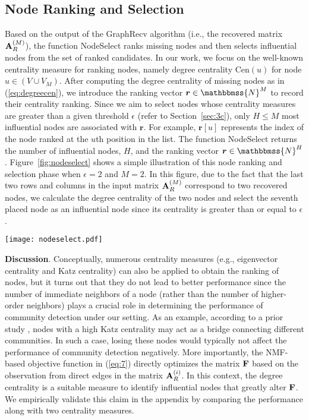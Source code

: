 \documentclass[format=acmsmall, review=false, screen=true]{acmart}
\newcommand{\N}{\mathbbmss{N}}
\begin{document}
\subsection{Node Ranking and Selection}\label{noderank}
Based on the output of the \textsf{GraphRecv} algorithm (i.e., the recovered matrix ${\bf A}^{(M)}_R$), the function \textsf{NodeSelect} ranks missing nodes and then selects influential nodes from the set of ranked candidates. In our work, we focus on the well-known centrality measure for ranking nodes, namely degree centrality $\text{Cen}(u)$ for node $u \in (V \cup V_M)$. 
After computing the degree centrality of missing nodes as in (\ref{eq:degreecen}), we introduce the ranking vector ${\bm r} \in \N^M$ to record their centrality ranking. Since we aim to select nodes whose centrality measures are greater than a given threshold $\epsilon$ (refer to Section~\ref{sec:3c}), only $H \leq M$ most influential nodes are associated with ${\bm r}$. For example, ${\bm r}[u]$ represents the index of the node ranked at the $u$th position in the list. The function \textsf{NodeSelect} returns the number of influential nodes, $H$, and the ranking vector ${\bm r \in \N^H}$. Figure~\ref{fig:nodeselect} shows a simple illustration of this node ranking and selection phase when $\epsilon = 2$ and $M = 2$. In this figure, due to the fact that the last two rows and columns in the input matrix ${\bf A}_R^{(M)}$ correspond to two recovered nodes, we calculate the degree centrality of the two nodes and select the seventh placed node as an influential node since its centrality is greater than or equal to $\epsilon$.
\begin{figure*}[t]
    \begin{center}
            \texttt{[image: nodeselect.pdf]}
            \caption{An illustration of the node ranking and selection phase. Here, parameters are set to the following values: $\epsilon = 2$ and $M = 2$.}
            \label{fig:nodeselect}
    \end{center}
\vspace{-0.1in}
\end{figure*}

{\bf Discussion}. Conceptually, numerous centrality measures (e.g., eigenvector centrality and Katz centrality) can also be applied to obtain the ranking of nodes, but it turns out that they do not lead to better performance since the number of immediate neighbors of a node (rather than the number of higher-order neighbors) plays a crucial role in determining the performance of community detection under our setting. As an example, according to a prior study \cite{katzweakness}, nodes with a high Katz centrality may act as a bridge connecting different communities. In such a case, losing these nodes would typically not affect the performance of community detection negatively. More importantly, the NMF-based objective function in (\ref{eq:7}) directly optimizes the matrix ${\bf F}$ based on the observation from direct edges in the matrix ${\bf A}_R^{(i)}$. In this context, the degree centrality is a suitable measure to identify influential nodes that greatly alter ${\bf F}$. We empirically validate this claim in the appendix by comparing the performance along with two centrality measures.
\end{document}

